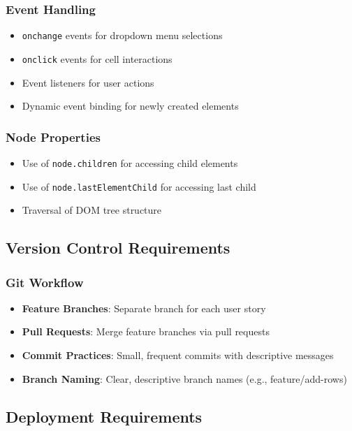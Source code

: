 \documentclass[11pt,a4paper]{article}
\begin{document}
\subsubsection{Event Handling}
\begin{itemize}[leftmargin=*]
    \item \texttt{onchange} events for dropdown menu selections
    \item \texttt{onclick} events for cell interactions
    \item Event listeners for user actions
    \item Dynamic event binding for newly created elements
\end{itemize}

\subsubsection{Node Properties}
\begin{itemize}[leftmargin=*]
    \item Use of \texttt{node.children} for accessing child elements
    \item Use of \texttt{node.lastElementChild} for accessing last child
    \item Traversal of DOM tree structure
\end{itemize}

\subsection{Version Control Requirements}

\subsubsection{Git Workflow}
\begin{itemize}[leftmargin=*]
    \item \textbf{Feature Branches}: Separate branch for each user story
    \item \textbf{Pull Requests}: Merge feature branches via pull requests
    \item \textbf{Commit Practices}: Small, frequent commits with descriptive messages
    \item \textbf{Branch Naming}: Clear, descriptive branch names (e.g., feature/add-rows)
\end{itemize}

\subsection{Deployment Requirements}
\end{document}

